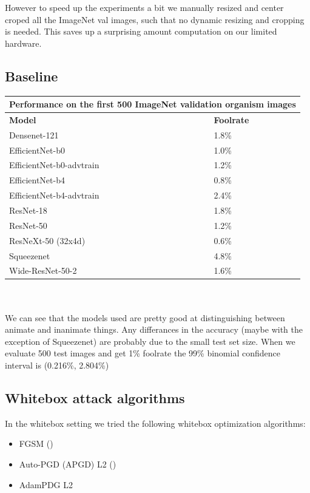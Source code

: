However to speed up the experiments a bit we manually resized and center croped all the ImageNet val images, such that no dynamic resizing and cropping is needed. This saves up a surprising amount computation on our limited hardware.


\subsection{Baseline}
\begin{tabular}{ ||p{5cm}|p{3cm}|| }
  \hline
     \multicolumn{2}{|c|}{Performance on the first 500 ImageNet validation organism images} \\
 \hline
 \textbf{Model} & \textbf{Foolrate} \\
 \hline
 \hline
 Densenet-121 & 1.8\%  \\
 \hline
 EfficientNet-b0 & 1.0\% \\
 \hline
 EfficientNet-b0-advtrain & 1.2\% \\
 \hline
 EfficientNet-b4 & 0.8\% \\
 \hline
 EfficientNet-b4-advtrain & 2.4\% \\
 \hline
 ResNet-18 & 1.8\% \\
 \hline
 ResNet-50 & 1.2\% \\
 \hline
 ResNeXt-50 (32x4d) & 0.6\% \\
 \hline
 Squeezenet & 4.8\% \\
 \hline
 Wide-ResNet-50-2 & 1.6\% \\
 \hline
\end{tabular} \\ \\

We can see that the models used are pretty good at distinguishing between animate and inanimate things. Any differances in the accuracy (maybe with the exception of Squeezenet) are probably due to the small test set size. When we evaluate 500 test images and get 1\% foolrate the 99\% binomial confidence interval is (0.216\%, 2.804\%)

\subsection{Whitebox attack algorithms}
In the whitebox setting we tried the following whitebox optimization algorithms:

\begin{itemize}
    \item FGSM (\cite{goodfellow2015explaining})
    \item Auto-PGD (APGD) L2 (\cite{croce2020reliable})
    \item AdamPDG L2
\end{itemize}


